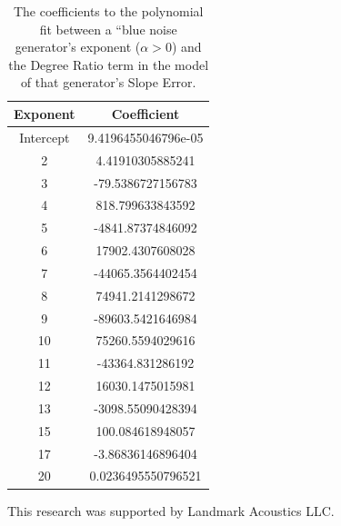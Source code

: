 \documentclass[preprint]{JASA}
\begin{document}
\begin{table}[ht]
  \caption{\label{tab:blue_model_coefficients}
    The coefficients to the polynomial fit between a ``blue noise generator's
    exponent ($\alpha > 0$) and the Degree Ratio term in the model of that
    generator's Slope Error.
  }
  \begin{ruledtabular}
    \begin{tabular}{cc}
      Exponent & Coefficient\\
      \hline
      Intercept & 9.4196455046796e-05\\
      2 & 4.41910305885241\\
      3 & -79.5386727156783\\
      4 & 818.799633843592\\
      5 & -4841.87374846092\\
      6 & 17902.4307608028\\
      7 & -44065.3564402454\\
      8 & 74941.2141298672\\
      9 & -89603.5421646984\\
      10 & 75260.5594029616\\
      11 & -43364.831286192\\
      12 & 16030.1475015981\\
      13 & -3098.55090428394\\
      15 & 100.084618948057\\
      17 & -3.86836146896404\\
      20 & 0.0236495550796521\\
    \end{tabular}
  \end{ruledtabular}
\end{table}

\begin{acknowledgments}
  This research was supported by Landmark Acoustics LLC.
\end{acknowledgments}




\end{document}
